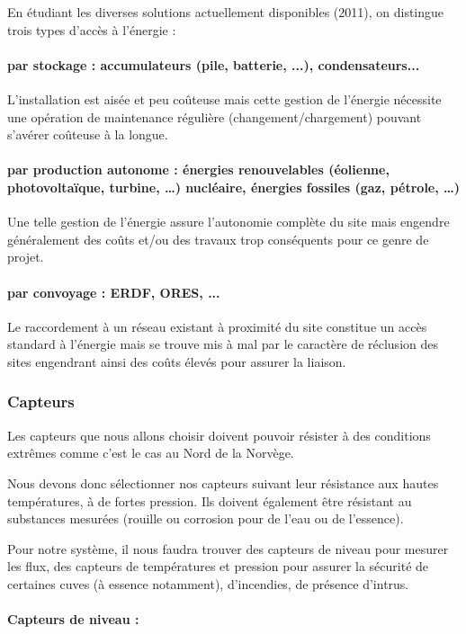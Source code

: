 \documentclass{article}
\begin{document}
En étudiant les diverses solutions actuellement disponibles (2011), on
distingue trois types d’accès à l’énergie :

\paragraph{par stockage : accumulateurs (pile, batterie, ...),
condensateurs...}
L’installation est aisée et peu coûteuse mais cette gestion de l’énergie
nécessite une opération de maintenance régulière
(changement/chargement) pouvant s’avérer coûteuse à la longue.

\paragraph{par production autonome : énergies renouvelables (éolienne,
photovoltaïque, turbine, …) nucléaire, énergies fossiles (gaz, pétrole,
…)}
Une telle gestion de l’énergie assure l’autonomie complète du site mais
engendre généralement des coûts et/ou des travaux trop conséquents pour
ce genre de projet.

\paragraph{par convoyage : ERDF, ORES, ...}

Le raccordement à un réseau existant à proximité du site constitue un
accès standard à l’énergie mais se trouve mis à mal par le caractère de
réclusion des sites engendrant ainsi des coûts élevés pour assurer la
liaison.

\subsubsection{Capteurs}
Les capteurs que nous allons choisir doivent pouvoir résister à des
conditions extrêmes comme c’est le cas au Nord de la Norvège.

Nous devons donc sélectionner nos capteurs suivant leur résistance aux
hautes températures, à de fortes pression. Ils doivent également être
résistant au substances mesurées (rouille ou corrosion pour de l’eau ou
de l’essence).

Pour notre système, il nous faudra trouver des capteurs de niveau pour
mesurer les flux, des capteurs de températures et pression pour assurer
la sécurité de certaines cuves (à essence notamment), d’incendies, de
présence d’intrus.

\paragraph{Capteurs de niveau :}
\end{document}

